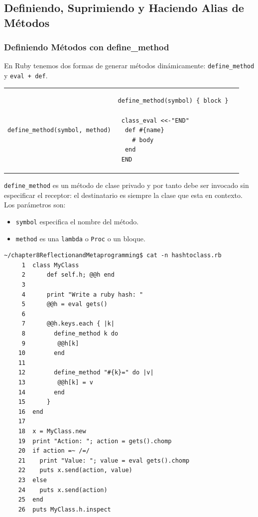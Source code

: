 \subsection{Definiendo, Suprimiendo y Haciendo Alias de Métodos}

\subsubsection{Definiendo Métodos con define\_method}
%      
En Ruby tenemos dos formas de generar métodos 
dinámicamente: \verb|define_method| y
\verb|eval + def|. 
\begin{tabular}{|p{6cm}|p{6cm}|}
\begin{verbatim}
define_method(symbol, method)

\end{verbatim}
&
\begin{verbatim}
define_method(symbol) { block }  

 class_eval <<-"END"
  def #{name}
    # body 
  end  
 END
\end{verbatim}
\end{tabular}
\verb|define_method| es un método de clase privado y por tanto debe ser invocado sin especificar 
el receptor: el destinatario es siempre la clase que esta en contexto.
Los parámetros son:

\begin{itemize}
\item
\verb|symbol| especifica el nombre del método. 
\item
\verb|method| es una \verb|lambda| o \verb|Proc| o un bloque.
\end{itemize}

\begin{verbatim}
~/chapter8ReflectionandMetaprogramming$ cat -n hashtoclass.rb 
     1  class MyClass 
     2      def self.h; @@h end
     3  
     4      print "Write a ruby hash: "
     5      @@h = eval gets() 
     6  
     7      @@h.keys.each { |k|
     8        define_method k do
     9         @@h[k] 
    10        end
    11  
    12        define_method "#{k}=" do |v|
    13         @@h[k] = v 
    14        end
    15      }
    16  end
    17  
    18  x = MyClass.new
    19  print "Action: "; action = gets().chomp
    20  if action =~ /=/
    21    print "Value: "; value = eval gets().chomp
    22    puts x.send(action, value)
    23  else 
    24    puts x.send(action)
    25  end
    26  puts MyClass.h.inspect
\end{verbatim}

